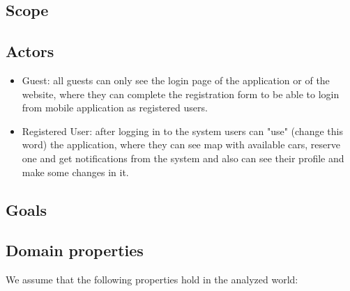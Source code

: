 \documentclass{article}
\begin{document}
		\subsection{Scope}
		
		\subsection{Actors}
		
		\begin{itemize}
			\item Guest: all guests can only see the login page of the application or of the website, where they can complete the registration form to be able to login from mobile application as registered users.
			
			\item Registered User: after logging in to the system users can "use" (change this word) the application, where they can see map with available cars, reserve one and get notifications from the system and also can see their profile and make some changes in it.   
		\end{itemize}  	

		\subsection{Goals}
		

		\subsection{Domain properties}
			We assume that the following properties hold in the analyzed world:			
			
\end{document}
